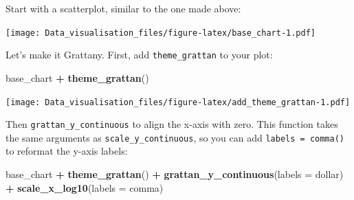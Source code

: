\documentclass[]{book}
\newenvironment{Shaded}{\begin{snugshade}}{\end{snugshade}}
\newcommand{\DataTypeTok}[1]{\textcolor[rgb]{0.13,0.29,0.53}{#1}}
\newcommand{\FloatTok}[1]{\textcolor[rgb]{0.00,0.00,0.81}{#1}}
\newcommand{\KeywordTok}[1]{\textcolor[rgb]{0.13,0.29,0.53}{\textbf{#1}}}
\newcommand{\NormalTok}[1]{#1}
\newcommand{\OperatorTok}[1]{\textcolor[rgb]{0.81,0.36,0.00}{\textbf{#1}}}
\newcommand{\StringTok}[1]{\textcolor[rgb]{0.31,0.60,0.02}{#1}}
\begin{document}
Start with a scatterplot, similar to the one made above:

\begin{Shaded}
\end{Shaded}

\texttt{[image: Data\_visualisation\_files/figure-latex/base\_chart-1.pdf]}

Let's make it Grattany. First, add \texttt{theme\_grattan} to your plot:

\begin{Shaded}
\begin{Highlighting}[]
\NormalTok{base_chart }\OperatorTok{+}
\StringTok{        }\KeywordTok{theme_grattan}\NormalTok{()}
\end{Highlighting}
\end{Shaded}

\texttt{[image: Data\_visualisation\_files/figure-latex/add\_theme\_grattan-1.pdf]}

Then \texttt{grattan\_y\_continuous} to align the x-axis with zero. This function takes the same arguments as \texttt{scale\_y\_continuous}, so you can add \texttt{labels\ =\ comma()} to reformat the y-axis labels:

\begin{Shaded}
\begin{Highlighting}[]
\NormalTok{base_chart }\OperatorTok{+}
\StringTok{        }\KeywordTok{theme_grattan}\NormalTok{() }\OperatorTok{+}
\StringTok{        }\KeywordTok{grattan_y_continuous}\NormalTok{(}\DataTypeTok{labels =}\NormalTok{ dollar) }\OperatorTok{+}
\StringTok{        }\KeywordTok{scale_x_log10}\NormalTok{(}\DataTypeTok{labels =}\NormalTok{ comma) }
\end{Highlighting}
\end{Shaded}
\end{document}
